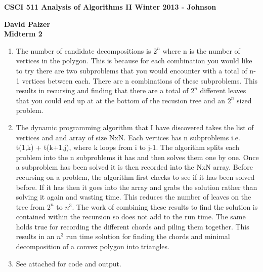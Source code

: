 \documentclass[11pt]{article}
\begin{document}
\textbf{CSCI 511 Analysis of Algorithms II \hfill Winter 2013 - Johnson}

\begin{center}
\textbf{David Palzer \\ Midterm 2}
\end{center}

\begin{enumerate}

\item The number of candidate decompositions is $2^n$ where n is the number of vertices in the polygon. This is because for each combination you would like to try there are two subproblems that you would encounter with a total of n-1 vertices between each. There are n combinations of these subproblems. This results in recursing and finding that there are a total of $2^n$ different leaves that you could end up at at the bottom of the recusion tree and an $2^n$ sized problem.

\item The dynamic programming algorithm that I have discovered takes the list of vertices and and array of size NxN. Each vertices has n subproblems i.e. t(1,k) + t(k+1,j), where k loops from i to j-1. The algorithm splits each problem into the n subproblems it has and then solves them one by one. Once a subproblem has been solved it is then recorded into the NxN array. Before recursing on a problem, the algorithm first checks to see if it has been solved before. If it has then it goes into the array and grabs the solution rather than solving it again and wasting time. This reduces the number of leaves on the tree from $2^n$ to $n^3$. The work of combining these results to find the solution is contained within the recursion so does not add to the run time. The same holds true for recording the different chords and piling them together. This results in an $n^3$ run time solution for finding the chords and minimal decomposition of a convex polygon into triangles.

\item See attached for code and output.

\end{enumerate}
\end{document}

